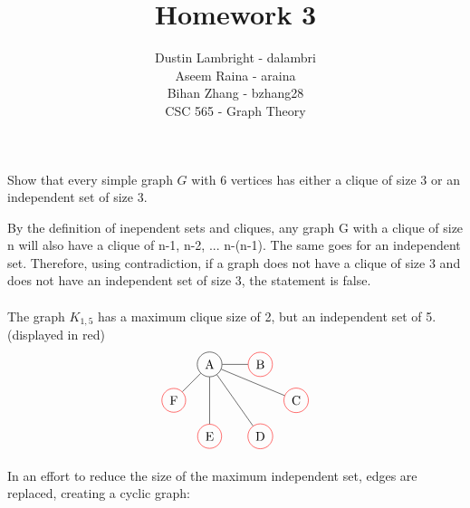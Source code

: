 \documentclass[12pt]{article}
\newenvironment{question}[2][Question]{\begin{trivlist}
\item[\hskip \labelsep {\bfseries #1}\hskip \labelsep {\bfseries #2.}]}{\end{trivlist}}
\begin{document}


\title{Homework 3}%
\author{Dustin Lambright - dalambri \\ Aseem Raina - araina \\ Bihan Zhang - bzhang28\\ %
CSC 565 - Graph Theory} %

\maketitle


\begin{question}{1}
Show that every simple graph $G$ with 6 vertices has either a clique of size 3 or an independent
set of size 3.
\end{question}

By the definition of inependent sets and cliques, any graph G with a clique of size n will also have a clique of n-1, n-2, ... n-(n-1).  The same goes for an independent set.  Therefore, using contradiction, if a graph does not have a clique of size 3 and does not have an independent set of size 3, the statement is false. \\ \\

The graph $K_{1,5}$ has a maximum clique size of 2, but an independent set of 5. (displayed in red)
\begin{align*}
\begin{tikzpicture}
\node[shape=circle,draw=black] (A) at (1,2) {A};
\node[shape=circle,draw=red] (B) at (2.4142857,2) {B};
\node[shape=circle,draw=red] (C) at (3.4142856,1) {C};
\node[shape=circle,draw=red] (D) at (2.4142857,0) {D};
\node[shape=circle,draw=red] (E) at (1,0) {E};
\node[shape=circle,draw=red] (F) at (0,1) {F};
\path [] (A) edge node[left] {} (B);
\path [] (A) edge node[left] {} (C);
\path [] (A) edge node[left] {} (D);
\path [] (A) edge node[left] {} (E);
\path [] (A) edge node[left] {} (F);
\end{tikzpicture}
\end{align*}

In an effort to reduce the size of the maximum independent set, edges are replaced, creating a cyclic graph: \\
\end{document}
